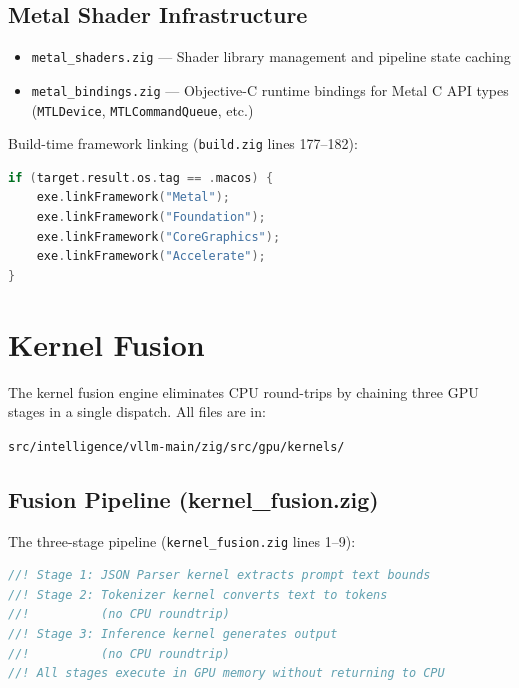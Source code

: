 \documentclass[11pt]{article}
\begin{document}
\subsection{Metal Shader Infrastructure}

\begin{itemize}
  \item \texttt{metal\_shaders.zig} --- Shader library management and pipeline
        state caching
  \item \texttt{metal\_bindings.zig} --- Objective-C runtime bindings for Metal
        C API types (\texttt{MTLDevice}, \texttt{MTLCommandQueue}, etc.)
\end{itemize}

Build-time framework linking (\texttt{build.zig} lines 177--182):
\begin{lstlisting}[language=C,caption={macOS framework linking (build.zig:177--182)}]
if (target.result.os.tag == .macos) {
    exe.linkFramework("Metal");
    exe.linkFramework("Foundation");
    exe.linkFramework("CoreGraphics");
    exe.linkFramework("Accelerate");
}
\end{lstlisting}

\section{Kernel Fusion}
\label{sec:fusion}

The kernel fusion engine eliminates CPU round-trips by chaining three GPU stages
in a single dispatch. All files are in:
\begin{center}
\texttt{src/intelligence/vllm-main/zig/src/gpu/kernels/}
\end{center}

\subsection{Fusion Pipeline (kernel\_fusion.zig)}

The three-stage pipeline (\texttt{kernel\_fusion.zig} lines 1--9):

\begin{lstlisting}[language=C,caption={Kernel fusion architecture (kernel\_fusion.zig:4--9)}]
//! Stage 1: JSON Parser kernel extracts prompt text bounds
//! Stage 2: Tokenizer kernel converts text to tokens
//!          (no CPU roundtrip)
//! Stage 3: Inference kernel generates output
//!          (no CPU roundtrip)
//! All stages execute in GPU memory without returning to CPU
\end{lstlisting}
\end{document}
